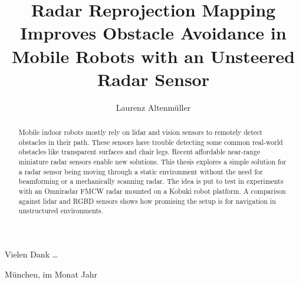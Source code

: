 \documentclass[%
	12pt,		%
	headinclude,	%
	a4paper,	%
	pointlessnumbers, %
	changebar,      %
	liststotoc,	%
	bibtotoc,
	idxtotoc,
	]{diplomarbeit}
\title{Radar Reprojection Mapping Improves Obstacle Avoidance in Mobile Robots with an Unsteered Radar Sensor}
\author{Laurenz Altenmüller}
\begin{document}
\renewcommand{\thepage}{t\arabic{page}}
\maketitle

 \pagestyle{empty}
\cleardoublepage 
\setcounter{page}{3}	%
\renewcommand{\thepage}{\roman{page}}
\begin{danksagung}
  Vielen Dank \dots

  München, im Monat Jahr
\end{danksagung}

\clearpage
\pagestyle{headings}
\tableofcontents

\listoffigures
\listoftables


\cleardoublepage 
\begin{abstract}
Mobile indoor robots mostly rely on lidar and vision sensors to remotely detect obstacles in their path. These sensors have trouble detecting some common real-world obstacles like transparent surfaces and chair legs. Recent affordable near-range miniature radar sensors enable new solutions.
This thesis explores a simple solution for a radar sensor being moving through a static environment without the need for beamforming or a mechanically scanning radar. The idea is put to test in experiments with an Omniradar FMCW radar mounted on a Kobuki robot platform. A comparison against lidar and RGBD sensors shows how promising the setup is for navigation in unstructured environments.
\end{abstract}

\newpage{\pagestyle{plain}\cleardoublepage}
\rmfamily	%
\renewcommand{\thepage}{\arabic{page}}
\setcounter{page}{1}
\end{document}
